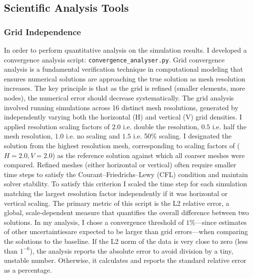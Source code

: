 \subsection{Scientific Analysis Tools} 
\subsubsection{Grid Independence}\label{grid_ind}
In order to  perform quantitative analysis on the simulation results. I developed a convergence analysis script: \texttt{convergence\_analyser.py}.
Grid convergence analysis is a fundamental verification technique in computational modeling that ensures numerical solutions are approaching the true solution as mesh resolution increases. The key principle is that as the grid is refined (smaller elements, more nodes), the numerical error should decrease systematically.
The grid analysis involved running simulations across 16 distinct mesh resolutions, generated by independently varying both the horizontal (H) and vertical (V) grid densities. 
I applied resolution scaling factors of $2.0$ i.e. double the resolution, $0.5$ i.e. half the mesh resolution, $1.0$ i.e. no scaling and $1.5$ i.e. 50\% scaling. I designated the solution from the highest resolution mesh, corresponding to scaling factors of ($H=2.0, V=2.0$) as the reference solution against which all coarser meshes were compared. Refined meshes (either horizontal or vertical) often require smaller time steps to satisfy the Courant–Friedrichs–Lewy (CFL) condition and maintain solver stability. To satisfy this criterion I scaled the time step for each simulation matching the largest resolution factor independently if it was horizontal or vertical scaling.
The primary metric of this script is the L2 relative error, a global, scale-dependent measure that quantifies the overall difference between two solutions. In my analysis, I chose a convergence threshold of $1\%$—since estimates of other uncertaintiesare expected to be larger than grid errors—when comparing the solutions to the baseline. If the L2 norm of the data is very close to zero (less than $1^{-6}$), the analysis reports the absolute error to avoid division by a tiny, unstable number. Otherwise, it calculates and reports the standard relative error as a percentage.%

